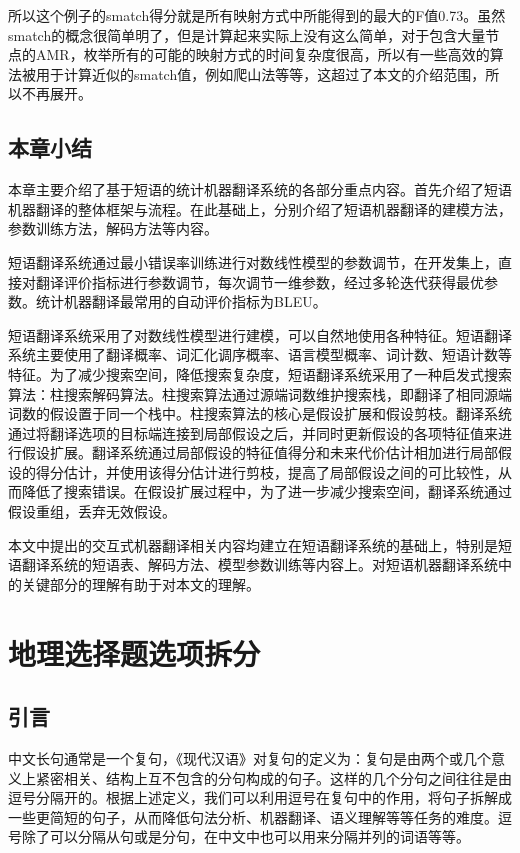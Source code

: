 \documentclass[master, winfont]{njuthesis}
\begin{document}
所以这个例子的smatch得分就是所有映射方式中所能得到的最大的F值0.73。虽然smatch的概念很简单明了，但是计算起来实际上没有这么简单，对于包含大量节点的AMR，枚举所有的可能的映射方式的时间复杂度很高，所以有一些高效的算法被用于计算近似的smatch值，例如爬山法等等，这超过了本文的介绍范围，所以不再展开。


\section{本章小结}
本章主要介绍了基于短语的统计机器翻译系统的各部分重点内容。首先介绍了短语机器翻译的整体框架与流程。在此基础上，分别介绍了短语机器翻译的建模方法，参数训练方法，解码方法等内容。

短语翻译系统通过最小错误率训练进行对数线性模型的参数调节，在开发集上，直接对翻译评价指标进行参数调节，每次调节一维参数，经过多轮迭代获得最优参数。统计机器翻译最常用的自动评价指标为BLEU。

短语翻译系统采用了对数线性模型进行建模，可以自然地使用各种特征。短语翻译系统主要使用了翻译概率、词汇化调序概率、语言模型概率、词计数、短语计数等特征。为了减少搜索空间，降低搜索复杂度，短语翻译系统采用了一种启发式搜索算法：柱搜索解码算法。柱搜索算法通过源端词数维护搜索栈，即翻译了相同源端词数的假设置于同一个栈中。柱搜索算法的核心是假设扩展和假设剪枝。翻译系统通过将翻译选项的目标端连接到局部假设之后，并同时更新假设的各项特征值来进行假设扩展。翻译系统通过局部假设的特征值得分和未来代价估计相加进行局部假设的得分估计，并使用该得分估计进行剪枝，提高了局部假设之间的可比较性，从而降低了搜索错误。在假设扩展过程中，为了进一步减少搜索空间，翻译系统通过假设重组，丢弃无效假设。

本文中提出的交互式机器翻译相关内容均建立在短语翻译系统的基础上，特别是短语翻译系统的短语表、解码方法、模型参数训练等内容上。对短语机器翻译系统中的关键部分的理解有助于对本文的理解。

\chapter{地理选择题选项拆分}
\label{chapter:split}
\section{引言}
中文长句通常是一个复句，《现代汉语》对复句的定义为：复句是由两个或几个意义上紧密相关、结构上互不包含的分句构成的句子\cite{zhou2008}。这样的几个分句之间往往是由逗号分隔开的。根据上述定义，我们可以利用逗号在复句中的作用，将句子拆解成一些更简短的句子，从而降低句法分析、机器翻译、语义理解等等任务的难度。逗号除了可以分隔从句或是分句，在中文中也可以用来分隔并列的词语等等。
\end{document}
